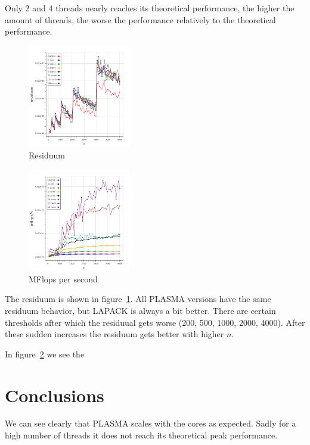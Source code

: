 \documentclass[a4paper,final,ngerman,english]{article}
\begin{document}
Only 2 and 4 threads nearly reaches its theoretical performance, the higher the amount of threads,
the worse the performance relatively to the theoretical performance.

\begin{figure}
	\centering
	\includegraphics[width=0.4\textwidth]{res}
	\caption{Residuum}
\label{fig:residuum}
\end{figure}
\begin{figure}
	\centering
	\includegraphics[width=0.4\textwidth]{mflops}
	\caption{MFlops per second}
\label{fig:mflops}
\end{figure}

The residuum is shown in figure~\ref{fig:residuum}.
All PLASMA versions have the same residuum behavior, but LAPACK is always a bit better.  
There are certain thresholds after which the residuual gets worse (200, 500, 1000, 2000, 4000).
After these sudden increases the residuum gets better with higher $n$.

In figure~\ref{fig:mflops} we see the 

\section{Conclusions}
We can see clearly that PLASMA scales with the cores as expected.
Sadly for a high number of threads it does not reach its theoretical peak performance.

%  
\begin{footnotesize}
\end{footnotesize}
\end{document}

